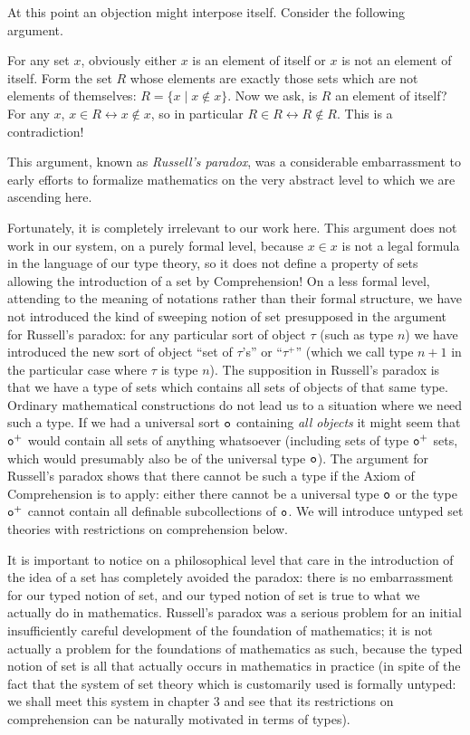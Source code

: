 \documentclass[12pt]{book}
\begin{document}
At this point an objection might interpose itself.  Consider the
following argument.

For any set $x$, obviously either $x$ is an element of itself or $x$
is not an element of itself.  Form the set $R$ whose elements are
exactly those sets which are not elements of themselves: $R = \{x \mid
x \not\in x\}$.  Now we ask, is $R$ an element of itself?  For any $x$,
$x \in R \leftrightarrow x \not\in x$, so in particular $R \in R \leftrightarrow R
\not\in R$.  This is a contradiction!

This argument, known as {\em Russell's paradox\/}, was a considerable
embarrassment to early efforts to formalize mathematics on the very
abstract level to which we are ascending here.  

Fortunately, it is completely irrelevant to our work here.  This
argument does not work in our system, on a purely formal level,
because $x \in x$ is not a legal formula in the language of our type
theory, so it does not define a property of sets allowing the
introduction of a set by Comprehension!  On a less formal level,
attending to the meaning of notations rather than their formal
structure, we have not introduced the kind of sweeping notion of set
presupposed in the argument for Russell's paradox: for any particular
sort of object $\tau$ (such as type $n$) we have introduced the new
sort of object ``set of $\tau$'s'' or ``$\tau^+$'' (which
we call type $n+1$ in the particular case where $\tau$ is type $n$).
The supposition in Russell's paradox is that we have a type of sets
which contains all sets of objects of that same type.  Ordinary
mathematical constructions do not lead us to a situation where we need
such a type.  If we had a universal sort ${\tt o}$ containing {\em all
objects\/} it might seem that ${\tt o}^+$ would contain all sets of
anything whatsoever (including sets of type ${\tt o}^+$ sets, which
would presumably also be of the universal type ${\tt o}$).  The
argument for Russell's paradox shows that there cannot be such a type
if the Axiom of Comprehension is to apply: either there cannot be a
universal type ${\tt o}$ or the type ${\tt o}^+$ cannot contain all
definable subcollections of ${\tt o}$.  We will introduce untyped set
theories with restrictions on comprehension below.

It is important to notice on a philosophical level that care in the
introduction of the idea of a set has completely avoided the paradox:
there is no embarrassment for our typed notion of set, and our typed
notion of set is true to what we actually do in mathematics.
Russell's paradox was a serious problem for an initial insufficiently
careful development of the foundation of mathematics; it is not
actually a problem for the foundations of mathematics as such, because
the typed notion of set is all that actually occurs in mathematics in
practice (in spite of the fact that the system of set theory which is
customarily used is formally untyped: we shall meet this system in
chapter 3 and see that its restrictions on comprehension can be
naturally motivated in terms of types).
\end{document}
